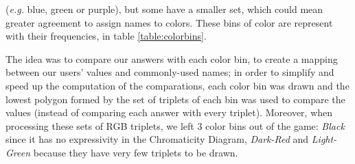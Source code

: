 (\emph{e.g.} blue, green or purple), but some have a smaller set, which could mean greater agreement to assign names to colors. These bins of color are represent with their frequencies, in table
\ref{table:colorbins}. \par
%
The idea was to compare our answers with each color bin, to create a mapping between our users' values and commonly-used names; in order to simplify and speed up the computation
of the comparations, each color bin was drawn and the lowest polygon formed by the set of triplets of each bin was used to compare the values (instead of comparing each answer
with every triplet). Moreover, when processing these sets of RGB triplets, we left 3 color bins out of the game: \emph{Black} since it has no expressivity in the Chromaticity Diagram,
\emph{Dark-Red} and \emph{Light-Green} because they have very few triplets to be drawn.
%

